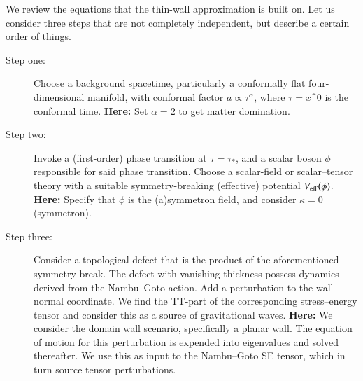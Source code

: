 









We review the equations that the thin-wall approximation is built on. %
Let us consider three steps that are not completely independent, but describe a certain order of things.
\begin{description}
    \item[Step one:] Choose a background spacetime, particularly a conformally flat four-dimensional manifold, with conformal factor $a\propto \tau^\alpha$, where $\tau=x\^0$ is the conformal time. \textbf{Here:} Set $\alpha=2$ to get matter domination.
    \item[Step two:] Invoke a (first-order) phase transition at $\tau = \tau_\ast$, and a scalar boson $\phi$ responsible for said phase transition. Choose a scalar-field or scalar--tensor theory with a suitable symmetry-breaking (effective) potential $V_\mathrm{eff}(\phi)$. \textbf{Here:} Specify that $\phi$ is the (a)symmetron field, and consider $\kappa=0$ (symmetron).
    \item[Step three:] Consider a topological defect that is the product of the aforementioned symmetry break. The defect with vanishing thickness possess dynamics derived from the Nambu--Goto action. Add a perturbation to the wall normal coordinate. We find the TT-part of the corresponding stress--energy tensor and consider this as a source of gravitational waves. \textbf{Here:} We consider the domain wall scenario, specifically a planar wall. The equation of motion for this perturbation is expended into eigenvalues and solved thereafter. We use this as input to the Nambu--Goto SE tensor, which in turn source tensor perturbations.
\end{description}

